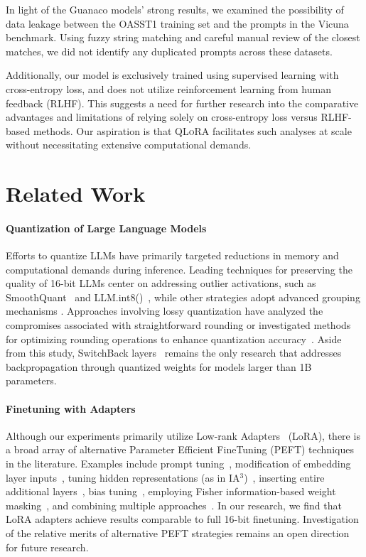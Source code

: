 In light of the {Guanaco} models’ strong results, we examined the possibility of data leakage between the OASST1 training set and the prompts in the Vicuna benchmark. Using fuzzy string matching and careful manual review of the closest matches, we did not identify any duplicated prompts across these datasets.

Additionally, our model is exclusively trained using supervised learning with cross-entropy loss, and does not utilize reinforcement learning from human feedback (RLHF). This suggests a need for further research into the comparative advantages and limitations of relying solely on cross-entropy loss versus RLHF-based methods. Our aspiration is that \textsc{QLoRA} facilitates such analyses at scale without necessitating extensive computational demands.

\section{Related Work}

\paragraph{Quantization of Large Language Models} Efforts to quantize LLMs have primarily targeted reductions in memory and computational demands during inference. Leading techniques for preserving the quality of 16-bit LLMs center on addressing outlier activations, such as SmoothQuant~\citep{xiao2022smoothquant} and LLM.int8()~\citep{dettmers2022llm}, while other strategies adopt advanced grouping mechanisms \citep{park2022nuqmm, yao2022zeroquant}. Approaches involving lossy quantization have analyzed the compromises associated with straightforward rounding \citep{dettmers2022case,zeng2022glm,pope2022efficiently} or investigated methods for optimizing rounding operations to enhance quantization accuracy~\citep{frantar2022gptq}. Aside from this study, SwitchBack layers~\citep{wortsman2023stable} remains the only research that addresses backpropagation through quantized weights for models larger than 1B parameters.

\paragraph{Finetuning with Adapters} Although our experiments primarily utilize Low-rank Adapters~\citep{hu2021lora} (LoRA), there is a broad array of alternative Parameter Efficient FineTuning (PEFT) techniques in the literature. Examples include prompt tuning~\citep{qin2021learning,lester2021power,li2021prefix}, modification of embedding layer inputs~\citep{an2022input}, tuning hidden representations (as in IA$^3$)~\citep{liu2022few}, inserting entire additional layers~\citep{houlsby2019parameter}, bias tuning~\citep{zaken2021bitfit}, employing Fisher information-based weight masking~\citep{sung2021training}, and combining multiple approaches~\citep{henderson2021compacter}. In our research, we find that LoRA adapters achieve results comparable to full 16-bit finetuning. Investigation of the relative merits of alternative PEFT strategies remains an open direction for future research.

